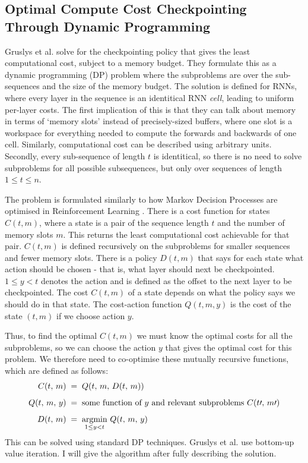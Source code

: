 \subsection{Optimal Compute Cost Checkpointing Through Dynamic Programming}
Gruslys et al. solve for the checkpointing policy that gives the least computational cost, subject to a memory budget.
They formulate this as a dynamic programming (DP) problem where the subproblems are over the sub-sequences and the size of the memory budget.
The solution is defined for RNNs, where every layer in the sequence is an identitical RNN \textit{cell}, leading to uniform per-layer costs.
The first implication of this is that they can talk about memory in terms of `memory slots' instead of precisely-sized buffers, where one slot is a workspace for everything needed to compute the forwards and backwards of one cell.
Similarly, computational cost can be described using arbitrary units.
Secondly, every sub-sequence of length \(t\) is identitical, so there is no need to solve subproblems for all possible subsequences, but only over sequences of length \(1\leq t\leq n\).

The problem is formulated similarly to how Markov Decision Processes are optimised in Reinforcement Learning \cite{Bellman1954, Sutton1998}.
There is a cost function for states \(C(t, m)\), where a state is a pair of the sequence length \(t\) and the number of memory slots \(m\).
This returns the least computational cost achievable for that pair.
\(C(t, m)\) is defined recursively on the subproblems for smaller sequences and fewer memory slots.
There is a policy \(D(t, m)\) that says for each state what action should be chosen - that is, what layer should next be checkpointed. \(1 \leq y < t\) denotes the action and is defined as the offset to the next layer to be checkpointed.
The cost \(C(t, m)\) of a state depends on what the policy says we should do in that state.
The cost-action function \(Q(t, m, y)\) is the cost of the state \((t, m)\) if we choose action \(y\).

Thus, to find the optimal \(C(t, m)\) we must know the optimal costs for all the subproblems, so we can choose the action \(y\) that gives the optimal cost for this problem.
We therefore need to co-optimise these mutually recursive functions, which are defined as follows:
\begin{align*}
    C(t,\, m)      \;&=\; Q(t,\, m,\, D(t,\, m))\\[0.5em]
    Q(t,\, m,\, y) \;&=\; \text{some function of } y \text{ and relevant subproblems } C(t\prime,\, m\prime)\\[0.5em]
    D(t,\, m)      \;&=\; \mathop{\mathrm{argmin}}_{1\leq y < t}\, Q(t,\, m,\, y)
\end{align*}
This can be solved using standard DP techniques. Gruslys et al. use bottom-up value iteration.
I will give the algorithm after fully describing the solution.

